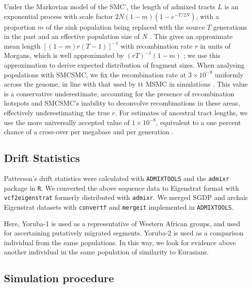  Under the Markovian model of the SMC', the length of admixed tracts $L$ is an exponential process with scale factor $2N (1 - m ) \left( 1 - e^{-T / 2N} \right)$, with a proportion $m$ of the sink population being replaced with the source $T$ generations in the past and an effective population size of $N$ \cite{Marjoram2006,Liang953}. This gives an approximate mean length $\left[ (1 -m)r(T-1) \right]^{-1}$ with recombination rate $r$ in units of Morgans, which is well approximated
by  $(rT)^{-1}(1-m)$ \cite{Racimo2015}; we use this approximation to derive expected distribution of fragment sizes. When analysing populations with SMCSMC, we fix the recombination rate at $3 \times 10^{-9}$ uniformly across the genome, in line with that used by {tt MSMC} in simulations \cite{Schiffels2014}.
This value is a conservative underestimate, accounting for the presence of recombination hotspots and SMCSMC's inability to deconvolve recombinations in these areas, effectively underestimating the true $r$.  For estimates of ancestral tract lengths, we use the more universally accepted value of $1 \times 10^{-8}$, equivalent to a one percent chance of a cross-over per megabase and per generation \cite{Dumont2008}. 


\subsection{Drift Statistics}

Patterson's drift statistics were calculated with {\tt ADMIXTOOLS} \cite{Patterson2012} and the {\tt admixr} package \cite{Petr2019} in {\tt R}. We converted the above sequence data to Eigenstrat format with {\tt vcf2eigenstrat} %
formerly distributed with {\tt admixr}. We merged SGDP and archaic Eigenstrat datasets with {\tt convertf} and {\tt mergeit} implemented in {\tt ADMIXTOOLS}. 

Here, Yoruba-1 is used as a representative of Western African groups, and used for ascertaining putatively migrated segments. Yoruba-2 is used as a comparison individual from the same populations. In this way, we look for evidence above another individual in the same population of similarity to Eurasians.

\subsection{Simulation procedure} \label{methods:simproc}

